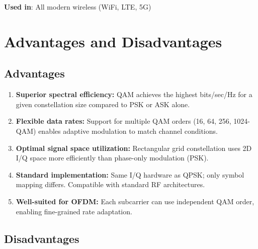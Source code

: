 \textbf{Used in}: All modern wireless (WiFi, LTE, 5G)

\section{Advantages and Disadvantages}

\subsection*{Advantages}

\begin{enumerate}
\item \textbf{Superior spectral efficiency:} QAM achieves the highest bits/sec/Hz for a given constellation size compared to PSK or ASK alone.

\item \textbf{Flexible data rates:} Support for multiple QAM orders (16, 64, 256, 1024-QAM) enables adaptive modulation to match channel conditions.

\item \textbf{Optimal signal space utilization:} Rectangular grid constellation uses 2D I/Q space more efficiently than phase-only modulation (PSK).

\item \textbf{Standard implementation:} Same I/Q hardware as QPSK; only symbol mapping differs. Compatible with standard RF architectures.

\item \textbf{Well-suited for OFDM:} Each subcarrier can use independent QAM order, enabling fine-grained rate adaptation.
\end{enumerate}

\subsection*{Disadvantages}

